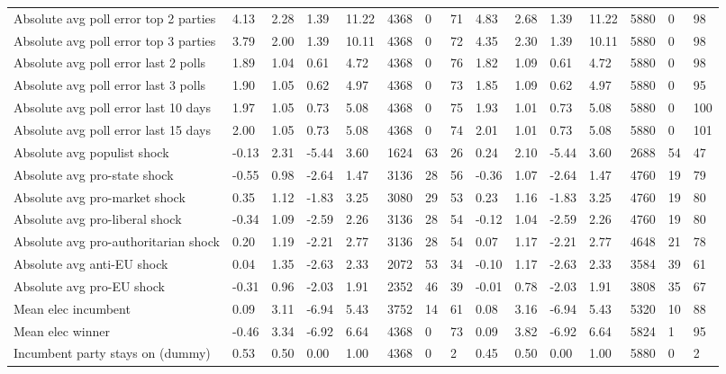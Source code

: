 \begin{longtable}{lllllllllllllll}
Absolute avg poll error top 2 parties & 4.13 & 2.28 & 1.39 & 11.22 & 4368 & 0 & 71 & 4.83 & 2.68 & 1.39 & 11.22 & 5880 & 0 & 98\\
Absolute avg poll error top 3 parties & 3.79 & 2.00 & 1.39 & 10.11 & 4368 & 0 & 72 & 4.35 & 2.30 & 1.39 & 10.11 & 5880 & 0 & 98\\
Absolute avg poll error last 2 polls & 1.89 & 1.04 & 0.61 & 4.72 & 4368 & 0 & 76 & 1.82 & 1.09 & 0.61 & 4.72 & 5880 & 0 & 98\\
\addlinespace
Absolute avg poll error last 3 polls & 1.90 & 1.05 & 0.62 & 4.97 & 4368 & 0 & 73 & 1.85 & 1.09 & 0.62 & 4.97 & 5880 & 0 & 95\\
Absolute avg poll error last 10 days & 1.97 & 1.05 & 0.73 & 5.08 & 4368 & 0 & 75 & 1.93 & 1.01 & 0.73 & 5.08 & 5880 & 0 & 100\\
Absolute avg poll error last 15 days & 2.00 & 1.05 & 0.73 & 5.08 & 4368 & 0 & 74 & 2.01 & 1.01 & 0.73 & 5.08 & 5880 & 0 & 101\\
Absolute avg populist shock & -0.13 & 2.31 & -5.44 & 3.60 & 1624 & 63 & 26 & 0.24 & 2.10 & -5.44 & 3.60 & 2688 & 54 & 47\\
Absolute avg pro-state shock & -0.55 & 0.98 & -2.64 & 1.47 & 3136 & 28 & 56 & -0.36 & 1.07 & -2.64 & 1.47 & 4760 & 19 & 79\\
\addlinespace
Absolute avg pro-market shock & 0.35 & 1.12 & -1.83 & 3.25 & 3080 & 29 & 53 & 0.23 & 1.16 & -1.83 & 3.25 & 4760 & 19 & 80\\
Absolute avg pro-liberal shock & -0.34 & 1.09 & -2.59 & 2.26 & 3136 & 28 & 54 & -0.12 & 1.04 & -2.59 & 2.26 & 4760 & 19 & 80\\
Absolute avg pro-authoritarian shock & 0.20 & 1.19 & -2.21 & 2.77 & 3136 & 28 & 54 & 0.07 & 1.17 & -2.21 & 2.77 & 4648 & 21 & 78\\
Absolute avg anti-EU shock & 0.04 & 1.35 & -2.63 & 2.33 & 2072 & 53 & 34 & -0.10 & 1.17 & -2.63 & 2.33 & 3584 & 39 & 61\\
Absolute avg pro-EU shock & -0.31 & 0.96 & -2.03 & 1.91 & 2352 & 46 & 39 & -0.01 & 0.78 & -2.03 & 1.91 & 3808 & 35 & 67\\
\addlinespace
Mean elec incumbent & 0.09 & 3.11 & -6.94 & 5.43 & 3752 & 14 & 61 & 0.08 & 3.16 & -6.94 & 5.43 & 5320 & 10 & 88\\
Mean elec winner & -0.46 & 3.34 & -6.92 & 6.64 & 4368 & 0 & 73 & 0.09 & 3.82 & -6.92 & 6.64 & 5824 & 1 & 95\\
Incumbent party stays on (dummy) & 0.53 & 0.50 & 0.00 & 1.00 & 4368 & 0 & 2 & 0.45 & 0.50 & 0.00 & 1.00 & 5880 & 0 & 2\\

\end{longtable}
